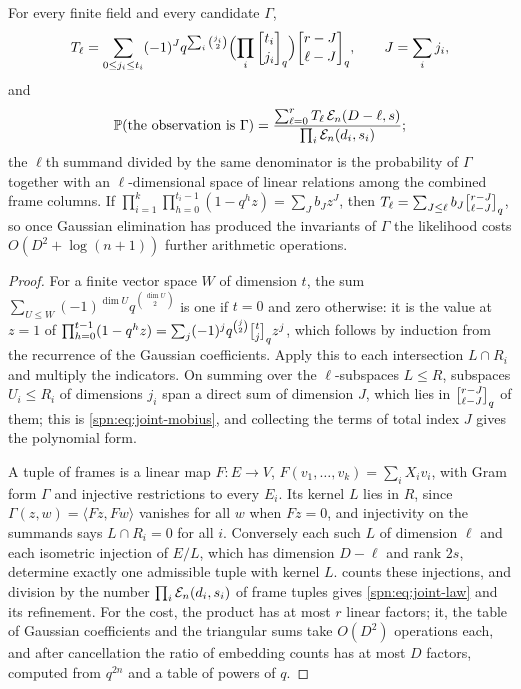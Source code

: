 \begin{theorem}\label{spn:thm:joint-law}
For every finite field and every candidate $\Gamma$,
\begin{equation}\label{spn:eq:joint-mobius}
 T_\ell=\sum_{0\le j_i\le t_i}(-1)^Jq^{\sum_i\binom{j_i}2}\Bigl(\prod_i\spnqbin{t_i}{j_i}q\Bigr)
 \spnqbin{r-J}{\ell-J}q,\qquad J=\sum_ij_i,
\end{equation}
and
\begin{equation}\label{spn:eq:joint-law}
 \mathbb{P}(\text{the observation is }\Gamma)=
 \frac{\sum_{\ell=0}^rT_\ell\,\mathcal{E}_n(D-\ell,s)}{\prod_i\mathcal{E}_n(d_i,s_i)} ;
\end{equation}
the $\ell$th summand divided by the same denominator is the probability of $\Gamma$ together with an
$\ell$-dimensional space of linear relations among the combined frame columns. If
$\prod_{i=1}^k\prod_{h=0}^{t_i-1}(1-q^hz)=\sum_Jb_Jz^J$, then
$T_\ell=\sum_{J\le\ell}b_J\spnqbin{r-J}{\ell-J}q$, so once Gaussian elimination has produced the
invariants of $\Gamma$ the likelihood costs $O(D^2+\log(n+1))$ further arithmetic operations.
\end{theorem}

\begin{proof}
For a finite vector space $W$ of dimension $t$, the sum
$\sum_{U\le W}(-1)^{\dim U}q^{\binom{\dim U}2}$ is one if $t=0$ and zero otherwise: it is the value at
$z=1$ of $\prod_{h=0}^{t-1}(1-q^hz)=\sum_j(-1)^jq^{\binom j2}\spnqbin tjqz^j$, which follows by
induction from the recurrence of the Gaussian coefficients. Apply this to each intersection
$L\cap R_i$ and multiply the indicators. On summing over the $\ell$-subspaces $L\le R$, subspaces
$U_i\le R_i$ of dimensions $j_i$ span a direct sum of dimension $J$, which lies in
$\spnqbin{r-J}{\ell-J}q$ of them; this is \eqref{spn:eq:joint-mobius}, and collecting the terms of
total index $J$ gives the polynomial form.

A tuple of frames is a linear map $F\colon E\to V$, $F(v_1,\dots,v_k)=\sum_iX_iv_i$, with Gram form
$\Gamma$ and injective restrictions to every $E_i$. Its kernel $L$ lies in $R$, since
$\Gamma(z,w)=\langle Fz,Fw\rangle$ vanishes for all $w$ when $Fz=0$, and injectivity on the summands
says $L\cap R_i=0$ for all $i$. Conversely each such $L$ of dimension $\ell$ and each isometric
injection of $E/L$, which has dimension $D-\ell$ and rank $2s$, determine exactly one admissible
tuple with kernel $L$.  counts these injections, and division by the
number $\prod_i\mathcal{E}_n(d_i,s_i)$ of frame tuples gives \eqref{spn:eq:joint-law} and its
refinement. For the cost, the product has at most $r$ linear factors; it, the table of Gaussian
coefficients and the triangular sums take $O(D^2)$ operations each, and after cancellation the
ratio of embedding counts has at most $D$ factors, computed from $q^{2n}$ and a table of powers of
$q$.
\end{proof}

